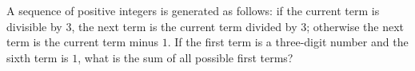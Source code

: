 A sequence of positive integers is generated as follows: if the current term is divisible by $3$, the next term is the current term divided by $3$; otherwise the next term is the current term minus $1$. If the first term is a three-digit number and the sixth term is $1$, what is the sum of all possible first terms?

